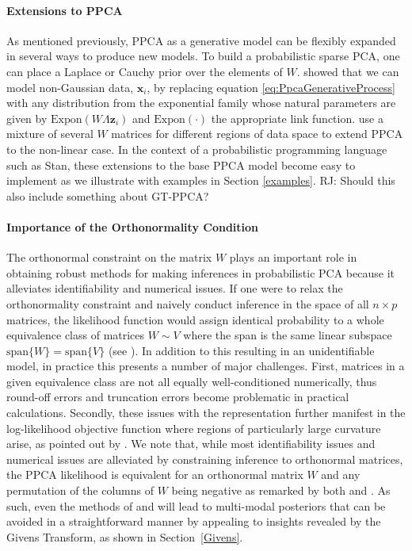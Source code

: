 \documentclass{article}
\newcommand{\commentRJ}[1]{{\textcolor{commentRJ_color}{RJ: #1}}}
\newcommand{\mb}[1]{\mathbf{#1}}
\begin{document}
\paragraph{Extensions to PPCA}
As mentioned previously, PPCA as a generative model can be flexibly expanded in several ways to produce new models. To build a probabilistic sparse PCA, one can place a Laplace or Cauchy prior over the elements of $W$. \citet{mohamed2009bayesian} showed that we can model non-Gaussian data, $\mb{x}_i$, by replacing equation \ref{eq:PpcaGenerativeProcess} with any distribution from the exponential family whose natural parameters are given by $\mathrm{Expon}(W\Lambda \mb{z}_i)$ and $\mathrm{Expon}(\cdot)$ the appropriate link function.\citet{ghahramani1996algorithm} use a mixture of several $W$ matrices for different regions of data space to extend PPCA to the non-linear case. In the context of a probabilistic programming language such as Stan, these extensions to the base PPCA model become easy to implement as we illustrate with examples in Section \ref{examples}. \commentRJ{Should this also include something about GT-PPCA?}

\paragraph{Importance of the Orthonormality Condition}
The orthonormal constraint on the matrix $W$ plays an important role in obtaining robust methods for making inferences in probabilistic PCA because it alleviates identifiability and numerical issues.  If one were to relax the orthonormality constraint and naively conduct inference in the space of all $n\times p$ matrices, the likelihood function would assign identical probability to a whole equivalence class of matrices $W \sim V$ where the span is the same linear subspace $\mbox{span}\{W\} = \mbox{span}\{V\}$ (see \citet[chapt.~12.1.3]{murphy2012machine}).  In addition to this resulting in an unidentifiable model, in practice this presents a number of major challenges.  First, matrices in a given equivalence class are not all equally well-conditioned numerically, thus round-off errors and truncation errors become problematic in practical calculations.  Secondly, these issues with the representation further manifest in the log-likelihood objective function where regions of particularly large curvature arise, as pointed out by \citep{holbrook2016bayesian}. We note that, while most identifiability issues and numerical issues are alleviated by constraining inference to orthonormal matrices, the PPCA likelihood is equivalent for an orthonormal matrix $W$ and any permutation of the columns of $W$ being negative as remarked by both \citet[chapt.~12.1.3]{murphy2012machine} and  \citet{holbrook2016bayesian}. As such, even the methods of \citet{brubaker2012family} and \citet{byrne2013geodesic} will lead to multi-modal posteriors that can be avoided in a straightforward manner by appealing to insights revealed by the Givens Transform, as shown in Section~\ref{Givens}.
\end{document}
